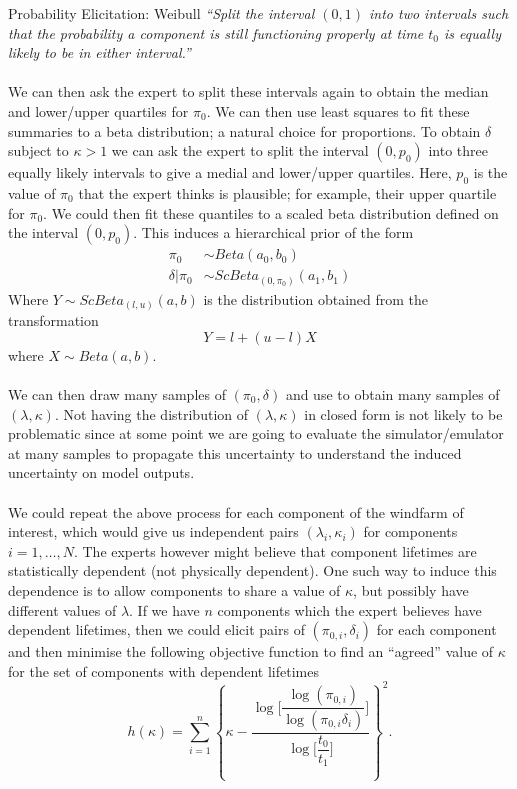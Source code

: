 \begin{chapter}{Probability Elicitation: Weibull \label{Chap:elic-weib}}
\textit{``Split the interval $(0, 1)$ into two intervals such that the probability a component is still functioning properly at time $t_0$ is equally likely to be in either interval.''}\\\\

We can then ask the expert to split these intervals again to obtain the median and lower/upper quartiles for $\pi_0$. We can then use least squares to fit these summaries to a beta distribution; a natural choice for proportions. To obtain $\delta$ subject to $\kappa>1$ we can ask the expert to split the interval $(0, p_0)$ into three equally likely intervals to give a medial and lower/upper quartiles. Here, $p_0$ is the value of $\pi_0$ that the expert thinks is plausible; for example, their upper quartile for $\pi_0$. We could then fit these quantiles to a scaled beta distribution defined on the interval $(0, p_0)$. This induces a hierarchical prior of the form
\begin{align}
	\pi_0 &\sim Beta(a_0, b_0) \\
	\delta | \pi_0 & \sim ScBeta_{(0, \pi_0)} (a_1, b_1)
\end{align}
Where $Y \sim ScBeta_{(l ,u)}(a, b)$ is the distribution obtained from the transformation 
\begin{equation}
	Y = l + (u - l)X
\end{equation}
where $X \sim Beta(a, b)$. \\\\
 We can then draw many samples of $(\pi_0, \delta)$ and use to obtain many samples of $(\lambda, \kappa)$. Not having the distribution of $(\lambda, \kappa)$ in closed form is not likely to be problematic since at some point we are going to evaluate the simulator/emulator at many samples to propagate this uncertainty to understand the induced uncertainty on model outputs.\\\\

We could repeat the above process for each component of the windfarm of interest, which would give us independent pairs $(\lambda_i, \kappa_i)$ for components $i = 1, \ldots, N$. The experts however might believe that component lifetimes are statistically dependent (not physically dependent). One such way to induce this dependence is to allow components to share a value of $\kappa$, but possibly have different values of $\lambda$. If we have $n$ components which the expert believes have dependent lifetimes, then we could elicit pairs of $(\pi_{0,i}, \delta_i)$ for each component and then minimise the following objective function to find an ``agreed'' value of $\kappa$ for the set of components with dependent lifetimes
\begin{equation}
h(\kappa) = \sum_{i = 1}^n \left\{\kappa - \dfrac{\log \bigg[ \dfrac{\log(\pi_{0,i})}{\log(\pi_{0,i} \delta_i)} \bigg]}{\log \bigg[ \dfrac{t_0}{t_1}\bigg]} \right\}^2 .\label{Eq:optim-fn}
\end{equation}



\end{chapter}
